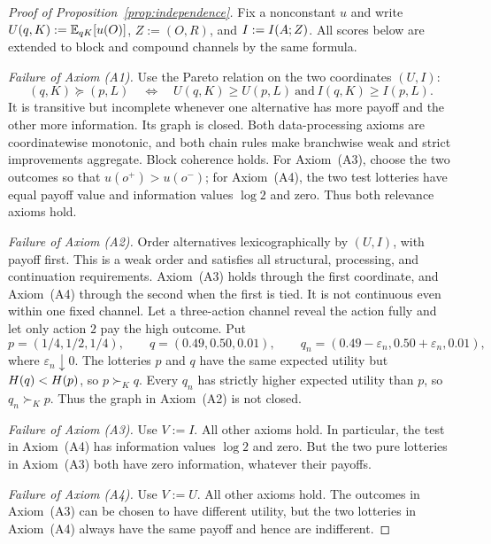 \begin{proof}[Proof of Proposition~\ref{prop:independence}]
Fix a nonconstant $u$ and write $U(q,K):=\mathbb E_{qK}[u(O)]$, $Z:=(O,R)$, and $I:=I(A;Z)$.  All scores below are
extended to block and compound channels by the same formula.

\emph{Failure of Axiom \textup{(A1)}.}
Use the Pareto relation on the two coordinates $(U,I)$:
\[
 (q,K)\succeq(p,L)
 \quad\Longleftrightarrow\quad
 U(q,K)\ge U(p,L)\ \text{and}\ I(q,K)\ge I(p,L).
\]
It is transitive but incomplete whenever one alternative has more payoff and the other more information.  Its graph is
closed.  Both data-processing axioms are coordinatewise monotonic, and both chain rules make branchwise weak and strict
improvements aggregate.  Block coherence holds.  For Axiom~\textup{(A3)}, choose the two outcomes so that
$u(o^+)>u(o^-)$; for Axiom~\textup{(A4)}, the two test lotteries have equal payoff value and information values
$\log2$ and zero.  Thus both relevance axioms hold.

\emph{Failure of Axiom \textup{(A2)}.}
Order alternatives lexicographically by $(U,I)$, with payoff first.  This is a weak order and satisfies all structural,
processing, and continuation requirements.  Axiom~\textup{(A3)} holds through the first coordinate, and
Axiom~\textup{(A4)} through the second when the first is tied.  It is not continuous even within one fixed channel.  Let a
three-action channel reveal the action fully and let only action $2$ pay the high outcome.  Put
\[
 p=(1/4,1/2,1/4),\qquad q=(0.49,0.50,0.01),\qquad
 q_n=(0.49-\varepsilon_n,0.50+\varepsilon_n,0.01),
\]
where $\varepsilon_n\downarrow0$.  The lotteries $p$ and $q$ have the same expected utility but
$H(q)<H(p)$, so $p\succ_Kq$.  Every $q_n$ has strictly higher expected utility than $p$, so
$q_n\succ_Kp$.  Thus the graph in Axiom~\textup{(A2)} is not closed.

\emph{Failure of Axiom \textup{(A3)}.}
Use $V:=I$.  All other axioms hold.  In particular, the test in
Axiom~\textup{(A4)} has information values $\log2$ and zero.  But the two pure
lotteries in Axiom~\textup{(A3)} both have zero information, whatever their payoffs.

\emph{Failure of Axiom \textup{(A4)}.}
Use $V:=U$.  All other axioms hold.  The outcomes in Axiom~\textup{(A3)} can be
chosen to have different utility, but the two lotteries in Axiom~\textup{(A4)}
always have the same payoff and hence are indifferent.


\end{proof}
